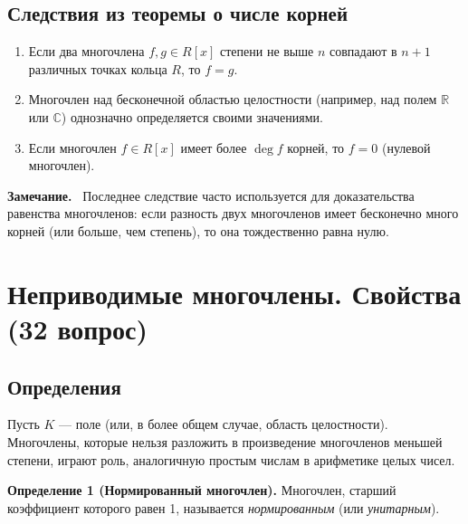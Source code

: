 \documentclass[a4paper,12pt]{article}
\newcommand{\myremark}{\textbf{Замечание.}\ }
\theoremstyle{definition}
\theoremstyle{plain}
\theoremstyle{remark}
\begin{document}
	\subsection{Следствия из теоремы о числе корней}
	
	\begin{tcolorbox}[colback=yellow!5, colframe=orange!50!black, title=Следствия]
		\begin{enumerate}
			\item Если два многочлена \( f, g \in R[x] \) степени не выше \( n \) совпадают в \( n+1 \) различных точках кольца \( R \), то \( f = g \).
			
			\item Многочлен над бесконечной областью целостности (например, над полем \( \mathbb{R} \) или \( \mathbb{C} \)) однозначно определяется своими значениями.
			
			\item Если многочлен \( f \in R[x] \) имеет более \( \deg f \) корней, то \( f = 0 \) (нулевой многочлен).
		\end{enumerate}
	\end{tcolorbox}
	
	\myremark
	Последнее следствие часто используется для доказательства равенства многочленов: если разность двух многочленов имеет бесконечно много корней (или больше, чем степень), то она тождественно равна нулю.
	
	
	
	
	
	
	
	
	\newpage
	\section{Неприводимые многочлены. Свойства (32 вопрос)}
	
	\subsection{Определения}
	
	Пусть \( K \) — поле (или, в более общем случае, область целостности). Многочлены, которые нельзя разложить в произведение многочленов меньшей степени, играют роль, аналогичную простым числам в арифметике целых чисел.
	
	\medskip
	
	\noindent \textbf{Определение 1 (Нормированный многочлен).}
	Многочлен, старший коэффициент которого равен 1, называется \textit{нормированным} (или \textit{унитарным}).
	
\end{document}
